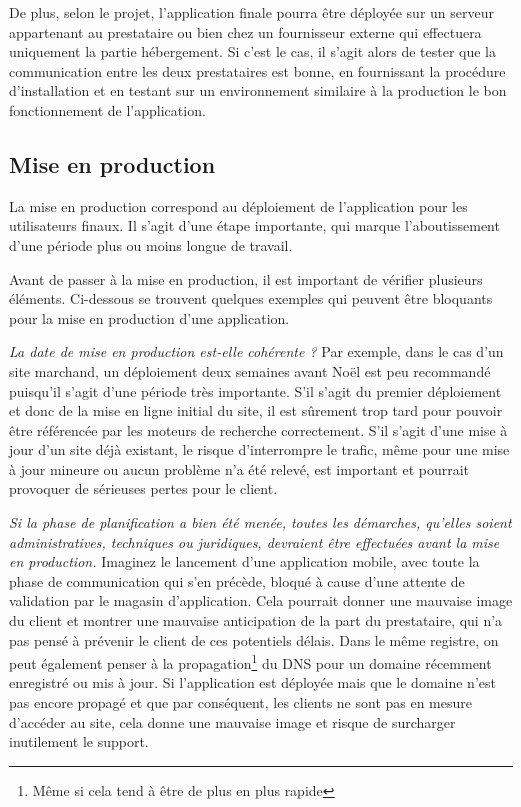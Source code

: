 De plus, selon le projet, l'application finale pourra être déployée sur un serveur appartenant au prestataire ou bien chez un fournisseur externe qui effectuera uniquement la partie hébergement. Si c'est le cas, il s'agit alors de tester que la communication entre les deux prestataires est bonne, en fournissant la procédure d'installation et en testant sur un environnement similaire à la production le bon fonctionnement de l'application.

\subsection{Mise en production}


La mise en production correspond au déploiement de l'application pour les utilisateurs finaux. Il s'agit d'une étape importante, qui marque l'aboutissement d'une période plus ou moins longue de travail.

Avant de passer à la mise en production, il est important de vérifier plusieurs éléments. Ci-dessous se trouvent quelques exemples qui peuvent être bloquants pour la mise en production d'une application.

\textit{La date de mise en production est-elle cohérente ?} Par exemple, dans le cas d'un site marchand, un déploiement deux semaines avant Noël est peu recommandé puisqu'il s'agit d'une période très importante. S'il s'agit du premier déploiement et donc de la mise en ligne initial du site, il est sûrement trop tard pour pouvoir être référencée par les moteurs de recherche correctement. S'il s'agit d'une mise à jour d'un site déjà existant, le risque d'interrompre le trafic, même pour une mise à jour mineure ou aucun problème n'a été relevé, est important et pourrait provoquer de sérieuses pertes pour le client.

\textit{Si la phase de planification a bien été menée, toutes les démarches, qu'elles soient administratives, techniques ou juridiques, devraient être effectuées avant la mise en production.} Imaginez le lancement d'une application mobile, avec toute la phase de communication qui s'en précède, bloqué à cause d'une attente de validation par le magasin d'application. Cela pourrait donner une mauvaise image du client et montrer une mauvaise anticipation de la part du prestataire, qui n'a pas pensé à prévenir le client de ces potentiels délais. Dans le même registre, on peut également penser à la propagation\footnote{Même si cela tend à être de plus en plus rapide} du \gls{DNS} pour un domaine récemment enregistré ou mis à jour. Si l'application est déployée mais que le domaine n'est pas encore propagé et que par conséquent, les clients ne sont pas en mesure d'accéder au site, cela donne une mauvaise image et risque de surcharger inutilement le support.

